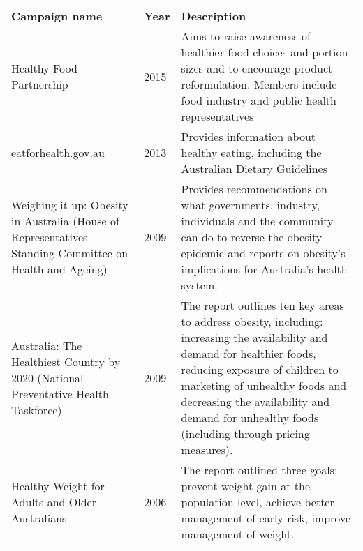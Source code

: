 \bgroup
\def\arraystretch{1.8}
\begin{tabularx}{\columnwidth}{ll*1{>{\arraybackslash}X}}
\toprule
\multicolumn{1}{p{3cm}}{\textbf{Campaign name}} & \textbf{Year} & \textbf{Description} \\ \cmidrule(lr){1-3}
\multicolumn{1}{p{3cm}}{Healthy Food Partnership} & 2015 & Aims to raise awareness of healthier food choices and portion sizes and to encourage product reformulation. Members include food industry and public health representatives \\
\multicolumn{1}{p{3cm}}{eatforhealth.gov.au} & 2013 & Provides information about healthy eating, including the Australian Dietary Guidelines \\
\multicolumn{1}{p{3cm}}{Weighing it up: Obesity in Australia (House of Representatives Standing Committee on Health and Ageing)} & 2009 & Provides recommendations on what governments, industry, individuals and the community can do to reverse the obesity epidemic and reports on obesity's implications for Australia's health system. \\ 
\multicolumn{1}{p{3cm}}{Australia: The Healthiest Country by 2020 (National Preventative Health Taskforce)} & 2009 & The report outlines ten key areas to address obesity, including: increasing the availability and demand for healthier foods, reducing exposure of children to marketing of unhealthy foods and decreasing the availability and demand for unhealthy foods (including through pricing measures). \\
\multicolumn{1}{p{3cm}}{Healthy Weight for Adults and Older Australians} & 2006 & The report outlined three goals; prevent weight gain at the population level, achieve better management of early risk, improve management of weight. \\
\bottomrule
\end{tabularx}
\egroup